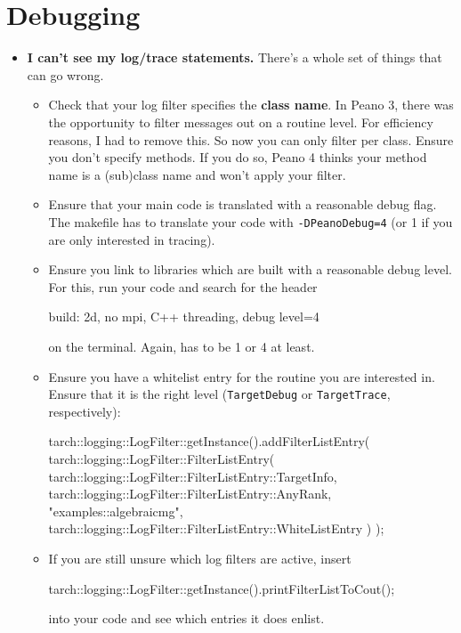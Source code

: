 \section{Debugging}
\begin{itemize}
  \item \textbf{I can't see my log/trace statements.} There's a whole set of
    things that can go wrong.
    \begin{itemize}
      \item Check that your log filter specifies the {\bf class name}. In Peano
      3, there was the opportunity to filter messages out on a routine level.
      For efficiency reasons, I had to remove this. So now you can only filter
      per class. Ensure you don't specify methods. If you do so, Peano 4 thinks
      your method name is a (sub)class name and won't apply your filter.
      \item Ensure that your main code is translated with
      a reasonable debug flag. The makefile has to translate your code with
      \texttt{-DPeanoDebug=4} (or 1 if you are only interested in tracing).
      \item     Ensure you link to libraries which are built with a reasonable debug level. 
    For this, run your code and search for the header
    \begin{terminalOutput}
build: 2d, no mpi, C++ threading, debug level=4
    \end{terminalOutput}
    on the terminal. Again, has to be 1 or 4 at least.
    \item Ensure you have a
    whitelist entry for the routine you are interested in. Ensure that it is the
    right level (\texttt{TargetDebug} or \texttt{TargetTrace}, respectively):
    \begin{code}
tarch::logging::LogFilter::getInstance().addFilterListEntry( 
  tarch::logging::LogFilter::FilterListEntry(
    tarch::logging::LogFilter::FilterListEntry::TargetInfo,
    tarch::logging::LogFilter::FilterListEntry::AnyRank,
    "examples::algebraicmg",
    tarch::logging::LogFilter::FilterListEntry::WhiteListEntry
  )
);
    \end{code}
    \item If you are still unsure which log filters are active, insert
    \begin{code}
tarch::logging::LogFilter::getInstance().printFilterListToCout();
    \end{code}
    into your code and see which entries it does enlist.
  \end{itemize}

\end{itemize}
